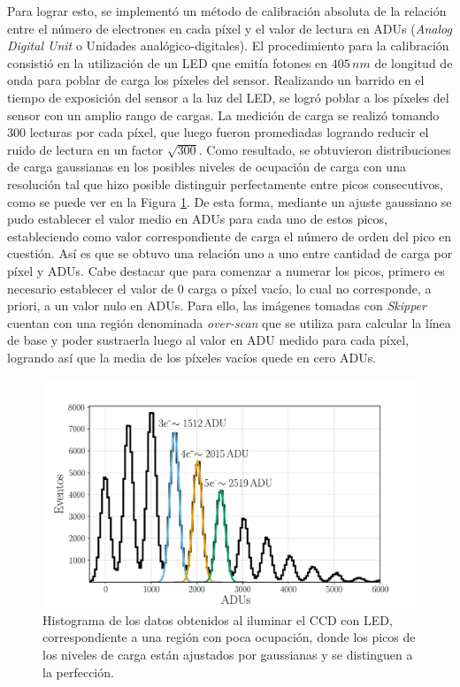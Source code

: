 Para lograr esto, se implementó un método de calibración absoluta de la relación entre el número de electrones en cada píxel y el valor de lectura en ADUs (\textit{Analog Digital Unit} o Unidades analógico-digitales). El procedimiento para la calibración consistió en la utilización de un LED que emitía fotones en $405\,\si{nm}$ de longitud de onda para poblar de carga los píxeles del sensor. Realizando un barrido en el tiempo de exposición del sensor a la luz del LED, se logró poblar a los píxeles del sensor con un amplio rango de cargas. La medición de carga se realizó tomando $300$ lecturas por cada píxel, que luego fueron promediadas logrando reducir el ruido de lectura en un factor $\sqrt{300}$. Como resultado, se obtuvieron distribuciones de carga gaussianas en los posibles niveles de ocupación de carga con una resolución tal que hizo posible distinguir perfectamente entre picos consecutivos, como se puede ver en la Figura \ref{fig:Calibracion}. De esta forma, mediante un ajuste gaussiano se pudo establecer el valor medio en ADUs para cada uno de estos picos, estableciendo como valor correspondiente de carga el número de orden del pico en cuestión. Así es que se obtuvo una relación uno a uno entre cantidad de carga por píxel y ADUs. Cabe destacar que para comenzar a numerar los picos, primero es necesario establecer el valor de $0$ carga o píxel vacío, lo cual no corresponde, a priori, a un valor nulo en ADUs. Para ello, las imágenes tomadas con \textit{Skipper} cuentan con una región denominada \textit{over-scan} que se utiliza para calcular la línea de base y poder sustraerla luego al valor en ADU medido para cada píxel, logrando así que la media de los píxeles vacíos quede en cero ADUs.
\begin{figure}[H]
    \centering
        \includegraphics[scale=0.5]{Figs/ajuste_gaussiano_calibracion.pdf}
    \caption{Histograma de los datos obtenidos al iluminar el CCD con LED, correspondiente a una región con poca ocupación, donde los picos de los niveles de carga están ajustados por gaussianas y se distinguen a la perfección.}
    \label{fig:Calibracion}
\end{figure}
